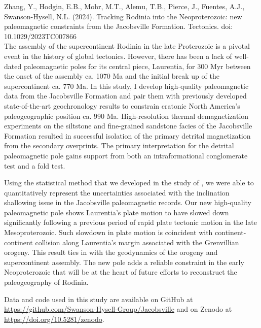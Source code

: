 \documentclass{ucbthesis}
\begin{document}
\begin{frontmatter}
Zhang, Y., Hodgin, E.B., Mohr, M.T., Alemu, T.B., Pierce, J., Fuentes, A.J., Swanson-Hysell, N.L. (2024). Tracking Rodinia into the Neoproterozoic: new paleomagnetic constraints from the Jacobsville Formation. Tectonics. doi: 10.1029/2023TC007866
\\

The assembly of the supercontinent Rodinia in the late Proterozoic is a pivotal event in the history of global tectonics. However, there has been a lack of well-dated paleomagnetic poles for its central piece, Laurentia, for 300 Myr between the onset of the assembly ca. 1070 Ma and the initial break up of the supercontinent ca. 770 Ma. In this study, I develop high-quality paleomagnetic data from the Jacobsville Formation and pair them with previously developed state-of-the-art geochronology results to constrain cratonic North America's paleogeographic position ca. 990 Ma. High-resolution thermal demagnetization experiments on the siltstone and fine-grained sandstone facies of the Jacobsville Formation resulted in successful isolation of the primary detrital magnetization from the secondary overprints. The primary interpretation for the detrital paleomagnetic pole gains support from both an intraformational conglomerate test and a fold test. 
 
Using the statistical method that we developed in the study of \cite{Pierce2022a}, we were able to quantitatively represent the uncertainties associated with the inclination shallowing issue in the Jacobsville paleomagnetic records. Our new high-quality paleomagnetic pole shows Laurentia's plate motion to have slowed down significantly following a previous period of rapid plate tectonic motion in the late Mesoproterozoic. Such slowdown in plate motion is coincident with continent-continent collision along Laurentia's margin associated with the Grenvillian orogeny. This result ties in with the geodynamics of the orogeny and supercontinent assembly. The new pole adds a reliable constraint in the early Neoproterozoic that will be at the heart of future efforts to reconstruct the paleogeography of Rodinia.

Data and code used in this study are available on GitHub at \url{https://github.com/Swanson-Hysell-Group/Jacobsville} and on Zenodo at \url{https://doi.org/10.5281/zenodo}.

\begin{acknowledgements}


\end{acknowledgements}
\end{frontmatter}
\end{document}
